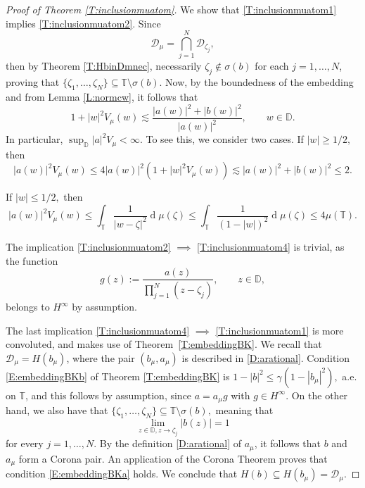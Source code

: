 \documentclass[12pt]{amsart}
\theoremstyle{definition}
\theoremstyle{remark}
\theoremstyle{remark}
\begin{document}
 
 \begin{proof}[Proof of Theorem \ref{T:inclusionmuatom}]
     We show that \ref{T:inclusionmuatom1} implies \ref{T:inclusionmuatom2}. Since
     \[\mathcal{D}_\mu= \bigcap_{j=1}^N\mathcal{D}_{\zeta_j},\] 
     then by Theorem \ref{T:HbinDmnec},  necessarily $\zeta_j\notin\sigma(b)$ for each $j=1,\ldots,N$, proving that $\{\zeta_1,\ldots,\zeta_N\} \subseteq \mathbb{T} \setminus \sigma(b)$.
     Now, by the boundedness of the embedding and from Lemma \ref{L:normcw}, it follows that
     \[1+|w|^2V_\mu(w)\lesssim \frac{|a(w)|^2+|b(w)|^2}{|a(w)|^2}, \qquad w\in\mathbb{D}.\]
     In particular, $\sup_{\mathbb{D}} |a|^2 V_\mu < \infty$. To see this, we consider two cases. If $|w|\geq 1/2,$ then 
     \[|a(w)|^2V_\mu(w)\leq 4|a(w)|^2(1+|w|^2V_\mu(w))\lesssim |a(w)|^2+|b(w)|^2 \leq 2. \]
     
     If $|w|\leq 1/2,$ then
     \[|a(w)|^2V_\mu(w)\leq \int_{\mathbb{T}}\frac{1}{|w-\zeta|^2}\operatorname{d}\!\mu(\zeta) \leq \int_{\mathbb{T}}\frac{1}{(1-|w|)^2}\operatorname{d}\!\mu(\zeta)\leq 4\mu(\mathbb{T}). \]
     

The implication \ref{T:inclusionmuatom2} $\implies$ \ref{T:inclusionmuatom4} is trivial, as the function
     \[g(z):=\frac{a(z)}{\prod_{j=1}^N(z - \zeta_j)}, \qquad z\in\mathbb{D},\]
     belongs to $H^\infty$ by assumption.
     
     The last implication \ref{T:inclusionmuatom4} $\implies$ \ref{T:inclusionmuatom1} is more convoluted, and makes use of Theorem~\ref{T:embeddingBK}. We recall that $\mathcal{D}_\mu = H(b_\mu)$, where the pair $(b_\mu,a_\mu)$ is described in \eqref{D:arational}. Condition \ref{E:embeddingBKb} of Theorem \ref{T:embeddingBK} is
     $1-|b|^2 \leq \gamma(1-|b_\mu|^2),$ a.e. on $\mathbb{T}$, and this follows by assumption, since $a=a_\mu g$ with $g\in H^\infty$. On the other hand, we also have that $\{\zeta_1,\ldots,\zeta_N\}\subseteq \mathbb{T}\setminus\sigma(b),$ meaning that 
     \[\lim_{z\in\mathbb{D},z\to\zeta_j} |b(z)|=1\]
     for every $j=1,\ldots,N$. By the definition \eqref{D:arational} of $a_\mu$, it follows that $b$ and $a_\mu$ form a Corona pair. An application of the Corona Theorem proves that condition \ref{E:embeddingBKa} holds. We conclude that $H(b) \subseteq H(b_\mu) = \mathcal{D}_\mu.$
 \end{proof}
\end{document}
